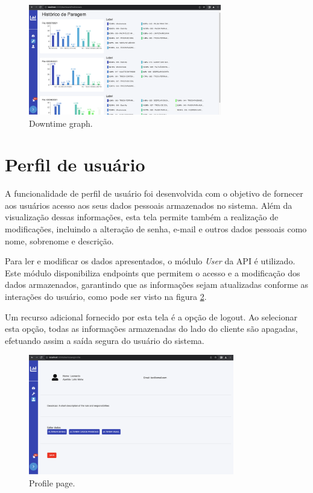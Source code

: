 \begin{figure}[htbp]
	\centering
	\includegraphics[width=0.75\textwidth]{images/downtime.png}
	\caption{Downtime graph.}
	\label{fig:downtime}
\end{figure}

\section[Perfil de usuário]{Perfil de usuário}\label{sec:profile}

A funcionalidade de perfil de usuário foi desenvolvida com o objetivo de fornecer aos usuários acesso aos seus dados pessoais armazenados no sistema. Além da visualização dessas informações, esta tela permite também a realização de modificações, incluindo a alteração de senha, e-mail e outros dados pessoais como nome, sobrenome e descrição.

Para ler e modificar os dados apresentados, o módulo \textit{User} da \gls{API} é utilizado. Este módulo disponibiliza endpoints que permitem o acesso e a modificação dos dados armazenados, garantindo que as informações sejam atualizadas conforme as interações do usuário, como pode ser visto na figura \ref{fig:profilePage}.

Um recurso adicional fornecido por esta tela é a opção de logout. Ao selecionar esta opção, todas as informações armazenadas do lado do cliente são apagadas, efetuando assim a saída segura do usuário do sistema.

\begin{figure}[htbp]
	\centering
	\includegraphics[width=0.8\textwidth]{images/profile.png}
	\caption{Profile page.}
	\label{fig:profilePage}
\end{figure}

